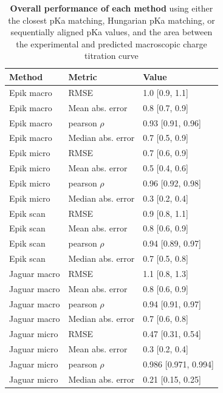 \documentclass[9pt,lineno,final]{elife}
\begin{document}
\begin{table}[H]
\centering
	\caption{{\bf Overall performance of each method} using either the closest pKa matching, Hungarian pKa matching, or sequentially aligned pKa values, and the area between the experimental and predicted macroscopic charge titration curve}
	\label{tab:overview-performance}
\begin{tabular}{lll}
\toprule
       Method &             Metric &                 Value \\
\midrule
  Epik macro &               RMSE &        1.0 [0.9, 1.1] \\
  Epik macro &    Mean abs. error &        0.8 [0.7, 0.9] \\
  Epik macro &     pearson $\rho$ &     0.93 [0.91, 0.96] \\
  Epik macro &  Median abs. error &        0.7 [0.5, 0.9] \\
  Epik micro &               RMSE &        0.7 [0.6, 0.9] \\
  Epik micro &    Mean abs. error &        0.5 [0.4, 0.6] \\
  Epik micro &     pearson $\rho$ &     0.96 [0.92, 0.98] \\
  Epik micro &  Median abs. error &        0.3 [0.2, 0.4] \\
   Epik scan &               RMSE &        0.9 [0.8, 1.1] \\
   Epik scan &    Mean abs. error &        0.8 [0.6, 0.9] \\
   Epik scan &     pearson $\rho$ &     0.94 [0.89, 0.97] \\
   Epik scan &  Median abs. error &        0.7 [0.5, 0.8] \\
Jaguar macro &               RMSE &        1.1 [0.8, 1.3] \\
Jaguar macro &    Mean abs. error &        0.8 [0.6, 0.9] \\
Jaguar macro &     pearson $\rho$ &     0.94 [0.91, 0.97] \\
Jaguar macro &  Median abs. error &        0.7 [0.6, 0.8] \\
Jaguar micro &               RMSE &     0.47 [0.31, 0.54] \\
Jaguar micro &    Mean abs. error &        0.3 [0.2, 0.4] \\
Jaguar micro &     pearson $\rho$ &  0.986 [0.971, 0.994] \\
Jaguar micro &  Median abs. error &     0.21 [0.15, 0.25] \\
\bottomrule
\end{tabular}
\end{table}
\end{document}

